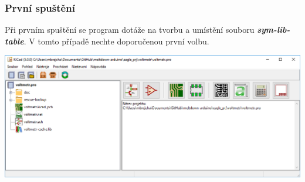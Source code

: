 \documentclass{beamer}
\begin{document}
	\begin{frame}
    \frametitle{První spuštění}
    \small
    Při prvním spuštění se program dotáže na tvorbu a umístění souboru \textit{\textbf{sym-lib-table}}. V tomto případě nechte doporučenou první volbu.
    \begin{center}
			\includegraphics[scale=0.4]{obr/kicad_nabidka.png}
		\end{center}
	\end{frame}
\end{document}
